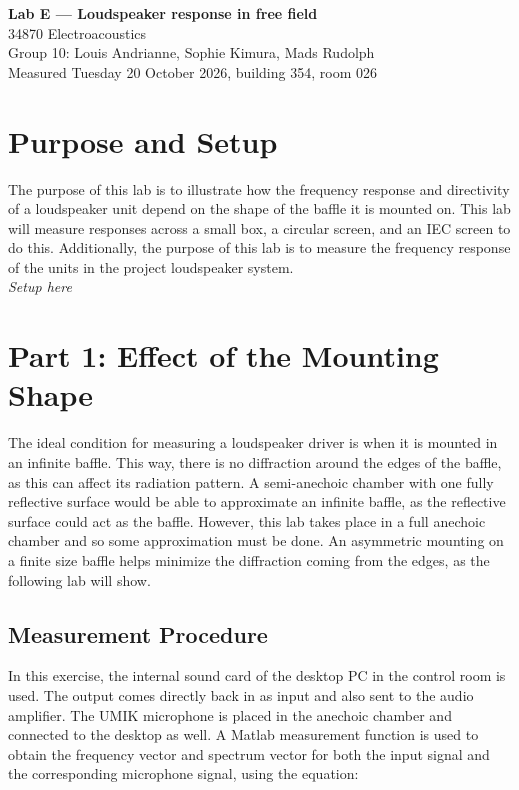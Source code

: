 \documentclass[a4paper,10pt]{article}
\begin{document}
\begin{center}
{\Large\bfseries Lab E --- Loudspeaker response in free field}\\[5pt]
34870 Electroacoustics\\[4pt]
Group 10: Louis Andrianne, Sophie Kimura, Mads Rudolph\\[4pt]
Measured Tuesday 20 October 2026, building 354, room 026
\end{center}
\thispagestyle{fancy}

\section{Purpose and Setup}

The purpose of this lab is to illustrate how the frequency response and directivity of a loudspeaker unit depend on the shape of the baffle it is mounted on. This lab will measure responses across a small box, a circular screen, and an IEC screen to do this. Additionally, the purpose of this lab is to measure the frequency response of the units in the project loudspeaker system.\\

\textit{Setup here}

\section{Part 1: Effect of the Mounting Shape}

The ideal condition for measuring a loudspeaker driver is when it is mounted in an infinite baffle. This way, there is no diffraction around the edges of the baffle, as this can affect its radiation pattern. A semi-anechoic chamber with one fully reflective surface would be able to approximate an infinite baffle, as the reflective surface could act as the baffle. However, this lab takes place in a full anechoic chamber and so some approximation must be done. An asymmetric mounting on a finite size baffle helps minimize the diffraction coming from the edges, as the following lab will show.

\subsection{Measurement Procedure}

In this exercise, the internal sound card of the desktop PC in the control room is used. The output comes directly back in as input and also sent to the audio amplifier. The UMIK microphone is placed in the anechoic chamber and connected to the desktop as well. A Matlab measurement function is used to obtain the frequency vector and spectrum vector for both the input signal and the corresponding microphone signal, using the equation:
\end{document}
